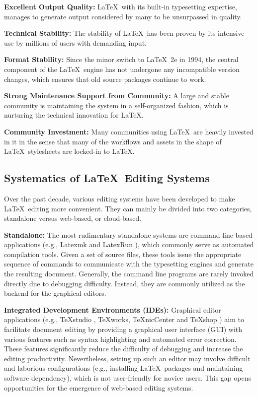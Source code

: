 \documentclass[sigconf]{acmart}
\begin{document}
{\bf Excellent Output Quality:} \LaTeX\,  with its built-in typesetting expertise,  manages to generate output considered by many to be unsurpassed in quality.

{\bf Technical Stability:} The stability of \LaTeX\ has been proven by its intensive use by millions of users with demanding input.

{\bf Format Stability:} Since the minor switch to \LaTeX\ 2e in 1994, the central component of the \LaTeX\ engine has not undergone any incompatible version changes, which ensures that old source packages continue to work. 

{\bf Strong Maintenance Support from Community:}  A large and stable community is maintaining the system in a self-organized fashion, which is nurturing the technical innovation for \LaTeX.

{\bf Community Investment:}  Many communities using \LaTeX\ are heavily invested in it in the sense that many of the workflows and assets in the shape of \LaTeX\ stylesheets are locked-in to \LaTeX.


\subsection{Systematics of \LaTeX\ Editing Systems}
Over the past decade, various editing systems have been developed to make \LaTeX\  editing more convenient.  
They can mainly be divided into two categories, standalone versus web-based, or cloud-based.

\textbf{Standalone:} 
The most rudimentary standalone systems are command line based applications  (e.g., {Latexmk} \cite{collins2015latexmk} and {LatexRun} \cite{latexrun}), which commonly serve as automated compilation tools. 
Given a set of source files, these tools issue the appropriate sequence of commands to communicate with the typesetting engines and generate the resulting document. 
Generally, the command line programs are rarely invoked directly due to debugging difficulty. 
Instead, they  are commonly utilized as the backend for the graphical editors.

\textbf{Integrated Development Environments (IDEs):}
Graphical editor applications (e.g., TeXstudio \cite{vantexstudio}, TeXworks, TeXnicCenter and TeXshop \cite{koch2006texshop}) aim to facilitate document editing by providing a graphical user interface (GUI) with various features such as syntax highlighting and automated error correction. 
These features significantly reduce the difficulty of debugging and increase the editing productivity.
Nevertheless, setting up such an editor may involve difficult and laborious configurations (e.g., installing \LaTeX\ packages and maintaining software dependency), which is not user-friendly for novice users. 
This gap opens opportunities for the emergence of web-based editing systems.
\end{document}
